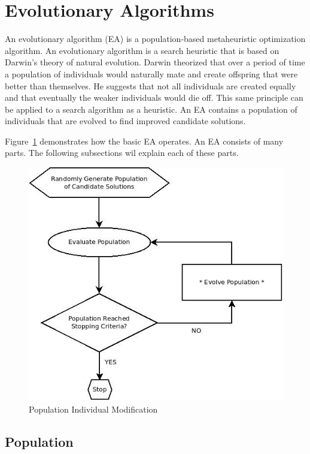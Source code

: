 \section{Evolutionary Algorithms}

An evolutionary algorithm (EA) is a population-based metaheuristic optimization algorithm. An evolutionary algorithm is a search heuristic that is based on Darwin's theory of natural evolution. Darwin theorized that over a period of time a population of individuals would naturally mate and create offspring that were better than themselves. He suggests that not all individuals are created equally and that eventually the weaker individuals would die off. This same principle can be applied to a search algorithm as a heuristic. An EA contains a population of individuals that are evolved to find improved candidate solutions.

Figure~\ref{fig:evolutionaryFlowchart} demonstrates how the basic EA operates. An EA consists of many parts. The following subsections wil explain each of these parts.

\begin{figure}[H]
	\centering
	\includegraphics[bb=0 0 524 481,scale=0.5]{figures/EA.jpeg}
	\caption{Population Individual Modification}
	\label{fig:evolutionaryFlowchart}
\end{figure}

\subsection{Population}

